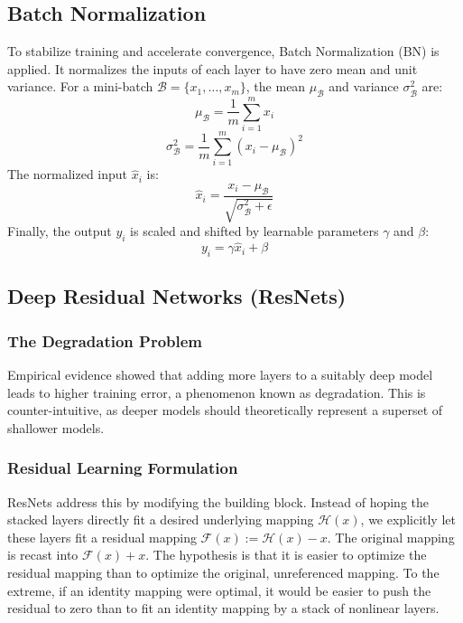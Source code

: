 \documentclass[11pt, a4paper]{article}
\begin{document}
\subsection{Batch Normalization}
To stabilize training and accelerate convergence, Batch Normalization (BN) is applied. It normalizes the inputs of each layer to have zero mean and unit variance. For a mini-batch $\mathcal{B} = \{x_1, \dots, x_m\}$, the mean $\mu_{\mathcal{B}}$ and variance $\sigma_{\mathcal{B}}^2$ are:
\begin{equation}
\mu_{\mathcal{B}} = \frac{1}{m} \sum_{i=1}^{m} x_i
\end{equation}
\begin{equation}
\sigma_{\mathcal{B}}^2 = \frac{1}{m} \sum_{i=1}^{m} (x_i - \mu_{\mathcal{B}})^2
\end{equation}
The normalized input $\hat{x}_i$ is:
\begin{equation}
\hat{x}_i = \frac{x_i - \mu_{\mathcal{B}}}{\sqrt{\sigma_{\mathcal{B}}^2 + \epsilon}}
\end{equation}
Finally, the output $y_i$ is scaled and shifted by learnable parameters $\gamma$ and $\beta$:
\begin{equation}
y_i = \gamma \hat{x}_i + \beta
\end{equation}

\subsection{Deep Residual Networks (ResNets)}
\subsubsection{The Degradation Problem}
Empirical evidence showed that adding more layers to a suitably deep model leads to higher training error, a phenomenon known as degradation. This is counter-intuitive, as deeper models should theoretically represent a superset of shallower models.

\subsubsection{Residual Learning Formulation}
ResNets address this by modifying the building block. Instead of hoping the stacked layers directly fit a desired underlying mapping $\mathcal{H}(x)$, we explicitly let these layers fit a residual mapping $\mathcal{F}(x) := \mathcal{H}(x) - x$. The original mapping is recast into $\mathcal{F}(x) + x$.
The hypothesis is that it is easier to optimize the residual mapping than to optimize the original, unreferenced mapping. To the extreme, if an identity mapping were optimal, it would be easier to push the residual to zero than to fit an identity mapping by a stack of nonlinear layers.
\end{document}
